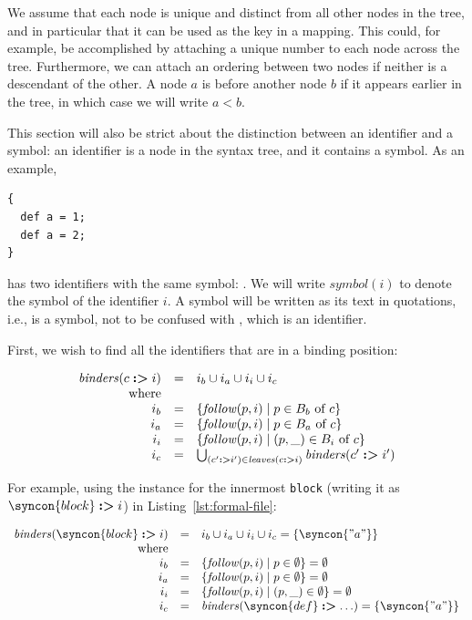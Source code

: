 \documentclass{kththesis}
\begin{document}
We assume that each node is unique and distinct from all other nodes in the tree, and in particular that it can be used as the key in a mapping. This could, for example, be accomplished by attaching a unique number to each node across the tree. Furthermore, we can attach an ordering between two nodes if neither is a descendant of the other. A node $a$ is before another node $b$ if it appears earlier in the tree, in which case we will write $a < b$.


This section will also be strict about the distinction between an identifier and a symbol: an identifier is a node in the syntax tree, and it contains a symbol. As an example,

\begin{verbatim}
{
  def a = 1;
  def a = 2;
}
\end{verbatim}

\newcommand{\sym}{\ensuremath{\mathit{symbol}}}
\newcommand{\symlit}[1]{\text{''#1''}}

has two identifiers with the same symbol: \symlit{a}. We will write $\sym(i)$ to denote the symbol of the identifier $i$. A symbol will be written as its text in quotations, i.e., \symlit{a} is a symbol, not to be confused with , which is an identifier.

First, we wish to find all the identifiers that are in a binding position:

\newcommand{\binders}{\ensuremath{\mathit{binders}}}

$$
\begin{array}{rcl}
\binders(c \tagged i) & = & i_b \cup i_a \cup i_i \cup i_c \\
\text{where} & & \\
i_b & = & \{ \follow(p, i) \mid p \in B_b \text{ of } c\} \\
i_a & = & \{ \follow(p, i) \mid p \in B_a \text{ of } c\} \\
i_i & = & \{ \follow(p, i) \mid (p, \_) \in B_i \text{ of } c\} \\
i_c & = & \bigcup_{(c' \tagged i') \in \leaves(c \tagged i)} \binders(c' \tagged i') \\
\end{array}
$$

For example, using the instance for the innermost \texttt{block} (writing it as $\syncon{block} \tagged i$) in Listing~\ref{lst:formal-file}:

$$
\begin{array}{rcl}
\binders(\syncon{block} \tagged i) & = & i_b \cup i_a \cup i_i \cup i_c = \{\syncon{"a"}\}\\
\text{where} & & \\
i_b & = & \{ \follow(p, i) \mid p \in \emptyset \} = \emptyset \\
i_a & = & \{ \follow(p, i) \mid p \in \emptyset \} = \emptyset \\
i_i & = & \{ \follow(p, i) \mid (p, \_) \in \emptyset \} = \emptyset \\
i_c & = & \binders(\syncon{def} \tagged \ldots) = \{\syncon{"a"}\} \\
\end{array}
$$
\end{document}

